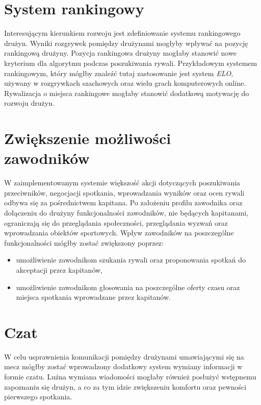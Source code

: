 \section{System rankingowy}

Interesującym kierunkiem rozwoju jest zdefiniowanie systemu rankingowego drużyn. Wyniki rozgrywek pomiędzy drużynami mogłyby wpływać na pozycję rankingową drużyny. Pozycja rankingowa drużyny mogłaby stanowić nowe kryterium dla algorytmu podczas poszukiwania rywali. Przykładowym systemem rankingowym, który mógłby znaleźć tutaj zastosowanie jest system \textit{ELO}, używany w rozgrywkach szachowych oraz wielu grach komputerowych online. Rywalizacja o miejsca rankingowe mogłaby stanowić dodatkową motywację do rozwoju drużyn. 

\section{Zwiększenie możliwości zawodników}

W zaimplementowanym systemie większość akcji dotyczących poszukiwania przeciwników, negocjacji spotkania, wprowadzania wyników oraz ocen rywali odbywa się za pośrednictwem kapitana. Po założeniu profilu zawodnika oraz dołączeniu do drużyny funkcjonalności zawodników, nie będących kapitanami, ograniczają się do przeglądania społeczności, przeglądania wyzwań oraz wprowadzania obiektów sportowych. Wpływ zawodników na poszczególne funkcjonalności mógłby zostać zwiększony poprzez:

\begin{itemize}
    \item umożliwienie zawodnikom szukania rywali oraz proponowania spotkań do akceptacji przez kapitanów,
    \item umożliwienie zawodnikom głosowania na poszczególne oferty czasu oraz miejsca spotkania wprowadzane przez kapitanów.
\end{itemize}

\section{Czat}

W celu usprawnienia komunikacji pomiędzy drużynami umawiającymi się na mecz mógłby zostać wprowadzony dodatkowy system wymiany informacji w formie czatu. Luźna wymiana wiadomości mogłaby również posłużyć wstępnemu zapoznaniu się drużyn, a co za tym idzie zwiększeniu komfortu oraz pewności pierwszego spotkania.


